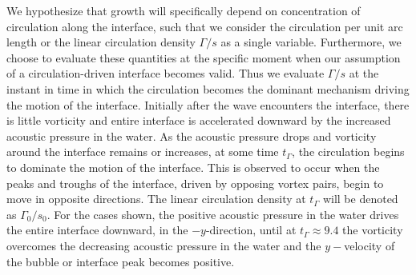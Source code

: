 We hypothesize that growth will specifically depend on concentration
of circulation along the interface, such that we consider the
circulation per unit arc length or the linear circulation density
$\Gamma/s$ as a single variable. Furthermore, we choose to evaluate
these quantities at the specific moment when our assumption of a
circulation-driven interface becomes valid. Thus we evaluate
$\Gamma/s$ at the instant in time in which the circulation becomes the
dominant mechanism driving the motion of the interface. Initially
after the wave encounters the interface, there is little vorticity and
entire interface is accelerated downward by the increased acoustic
pressure in the water. As the acoustic pressure drops and vorticity
around the interface remains or increases, at some time $t_\Gamma$,
the circulation begins to dominate the motion of the interface. This
is observed to occur when the peaks and troughs of the interface,
driven by opposing vortex pairs, begin to move in opposite
directions. The linear circulation density at $t_\Gamma$ will be
denoted as $\Gamma_0/s_0$. For the cases shown, the positive acoustic
pressure in the water drives the entire interface downward, in the
$-y$-direction, until at $t_\Gamma\approx9.4$ the vorticity overcomes
the decreasing acoustic pressure in the water and the $y-$velocity of
the bubble or interface peak becomes positive.

